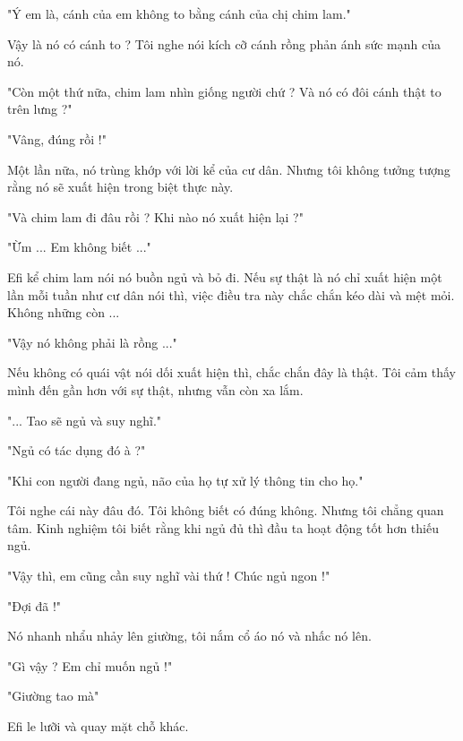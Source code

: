 "Ý em là, cánh của em không to bằng cánh của chị chim lam."

Vậy là nó có cánh to ? Tôi nghe nói kích cỡ cánh rồng phản ánh sức mạnh của nó.

"Còn một thứ nữa, chim lam nhìn giống người chứ ? Và nó có đôi cánh thật to trên lưng ?"

"Vâng, đúng rồi !"

Một lần nữa, nó trùng khớp với lời kể của cư dân. Nhưng tôi không tưởng tượng rằng nó sẽ xuất hiện trong biệt thực này.

"Và chim lam đi đâu rồi ? Khi nào nó xuất hiện lại ?"

"Ừm ... Em không biết ..."

Efi kể chim lam nói nó buồn ngủ và bỏ đi. Nếu sự thật là nó chỉ xuất hiện một lần mỗi tuần như cư dân nói thì, việc điều tra này chắc chắn kéo dài và mệt mỏi. Không những còn ...

"Vậy nó không phải là rồng ..."

Nếu không có quái vật nói dối xuất hiện thì, chắc chắn đây là thật. Tôi cảm thấy mình đến gần hơn với sự thật, nhưng vẫn còn xa lắm.

"... Tao sẽ ngủ và suy nghĩ."

"Ngủ có tác dụng đó à ?"

"Khi con người đang ngủ, não của họ tự xử lý thông tin cho họ."

Tôi nghe cái này đâu đó. Tôi không biết có đúng không. Nhưng tôi chẳng quan tâm. Kinh nghiệm tôi biết rằng khi ngủ đủ thì đầu ta hoạt động tốt hơn thiếu ngủ.

"Vậy thì, em cũng cần suy nghĩ vài thứ ! Chúc ngủ ngon !"

"Đợi đã !"

Nó nhanh nhẩu nhảy lên giường, tôi nắm cổ áo nó và nhấc nó lên.

"Gì vậy ? Em chỉ muốn ngủ !"

"Giường tao mà"

Efi le lưỡi và quay mặt chỗ khác.\\


